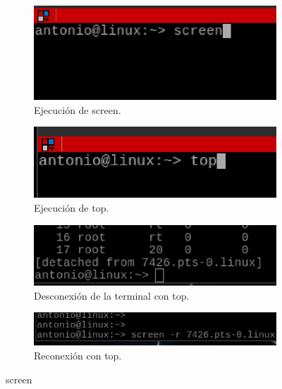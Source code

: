 \begin{figure}[H] 
  \begin{subfigure}[b]{0.5\linewidth}
    \centering
    \includegraphics[width=0.75\linewidth]{imagenes/img12.eps} 
    \caption{Ejecución de screen.} 
    \label{fig12} 
    \vspace{4ex}
  \end{subfigure}%
  \begin{subfigure}[b]{0.5\linewidth}
    \centering
    \includegraphics[width=0.75\linewidth]{imagenes/img13.eps} 
    \caption{Ejecución de top.} 
    \label{fig13} 
    \vspace{4ex}
  \end{subfigure} 
  \begin{subfigure}[b]{0.5\linewidth}
    \centering
    \includegraphics[width=0.75\linewidth]{imagenes/img14.eps} 
    \caption{Desconexión de la terminal con top.} 
    \label{fig14} 
  \end{subfigure}%
  \begin{subfigure}[b]{0.5\linewidth}
    \centering
    \includegraphics[width=0.75\linewidth]{imagenes/img15.eps} 
    \caption{Reconexión con top.} 
    \label{fig15} 
  \end{subfigure} 
  \caption{screen}
  \label{fig16} 
\end{figure}




